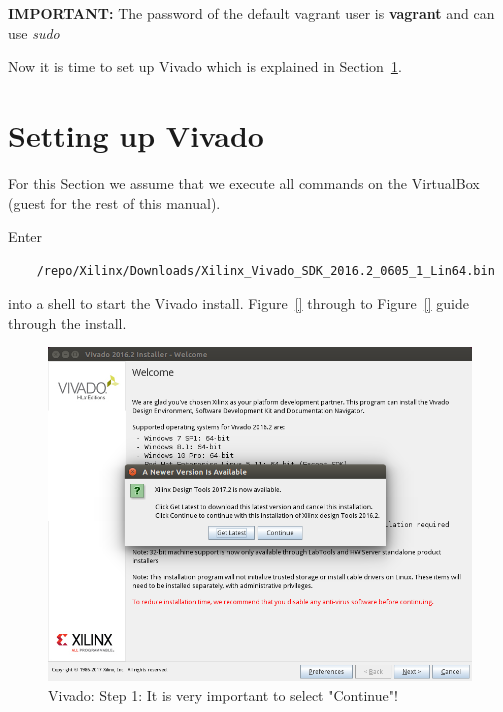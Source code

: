 \textbf{IMPORTANT:} The password of the default vagrant user is \textbf{vagrant} and can use \textit{sudo}

Now it is time to set up Vivado which is explained in Section~\ref{sec:devguide:fpga_toolchain:vivado}.

\section{Setting up Vivado}
\label{sec:devguide:fpga_toolchain:vivado}

For this Section we assume that we execute all commands on the VirtualBox (guest for the rest of this manual).

Enter

\begin{listing}
    \begin{verbatim}
    /repo/Xilinx/Downloads/Xilinx_Vivado_SDK_2016.2_0605_1_Lin64.bin
    \end{verbatim}
\end{listing}

into a shell to start the Vivado install.
Figure~\ref{} through to Figure~\ref{} guide through the install.

\begin{figure}
    \centering
    \includegraphics[width=1\textwidth,trim={0 8cm 0 8cm},clip]{images/devguide/vivado-install--1.png}
    \caption[Vivado: Step 1]{%
        Vivado: Step 1: It is very important to select "Continue"!
    }
    \label{fig:devguide:vivado1}
\end{figure}

